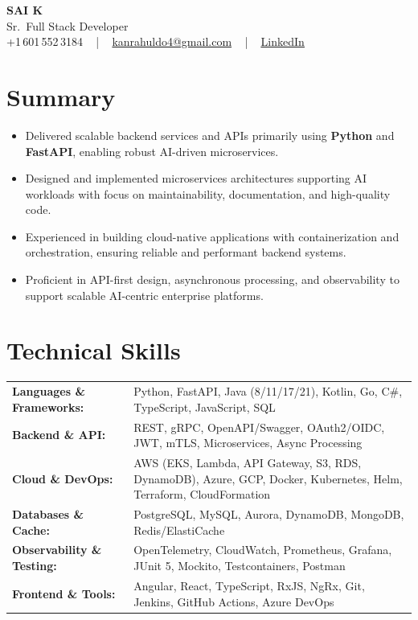 \documentclass[letterpaper,11pt]{article}
\newcommand{\resumeItem}[1]{
  \item\footnotesize{
    {#1 \vspace{-2pt}}
  }
}
\newcommand{\resumeItemListStart}{\begin{itemize}[leftmargin=*]}
\newcommand{\resumeItemListEnd}{\end{itemize}\vspace{-5pt}}
\begin{document}
\begin{center}
    {\fontsize{14pt}{12pt}\selectfont \textbf{\MakeUppercase{Sai K}}}\\ \vspace{2pt}
    \fontsize{10pt}{12pt}\selectfont Sr.\ Full Stack Developer\\ \vspace{2pt}
    \fontsize{10pt}{12pt}\selectfont +1\,601\,552\,3184 ~ | ~
    \href{mailto:kanrahuldo4@gmail.com}{kanrahuldo4@gmail.com} ~ | ~
    \href{https://www.linkedin.com/in/srrrk/}{\color{blue}\underline{LinkedIn}}
    \vspace{-10pt}
\end{center}

\section{Summary}
\fontsize{9pt}{10pt}\selectfont
\resumeItemListStart
  \resumeItem{Delivered scalable backend services and APIs primarily using \textbf{Python} and \textbf{FastAPI}, enabling robust AI-driven microservices.}
  \resumeItem{Designed and implemented microservices architectures supporting AI workloads with focus on maintainability, documentation, and high-quality code.}
  \resumeItem{Experienced in building cloud-native applications with containerization and orchestration, ensuring reliable and performant backend systems.}
  \resumeItem{Proficient in API-first design, asynchronous processing, and observability to support scalable AI-centric enterprise platforms.}
\resumeItemListEnd
\vspace{-6pt}

\section{Technical Skills}
\vspace{-14pt}
\begin{table}[h]
\fontsize{9pt}{10pt}\selectfont
\begin{tabular}{p{0.3\linewidth} p{0.7\linewidth}}
\textbf{Languages \& Frameworks:} & Python, FastAPI, Java (8/11/17/21), Kotlin, Go, C\#, TypeScript, JavaScript, SQL \\
\textbf{Backend \& API:} & REST, gRPC, OpenAPI/Swagger, OAuth2/OIDC, JWT, mTLS, Microservices, Async Processing \\
\textbf{Cloud \& DevOps:} & AWS (EKS, Lambda, API Gateway, S3, RDS, DynamoDB), Azure, GCP, Docker, Kubernetes, Helm, Terraform, CloudFormation \\
\textbf{Databases \& Cache:} & PostgreSQL, MySQL, Aurora, DynamoDB, MongoDB, Redis/ElastiCache \\
\textbf{Observability \& Testing:} & OpenTelemetry, CloudWatch, Prometheus, Grafana, JUnit 5, Mockito, Testcontainers, Postman \\
\textbf{Frontend \& Tools:} & Angular, React, TypeScript, RxJS, NgRx, Git, Jenkins, GitHub Actions, Azure DevOps \\
\end{tabular}
\end{table}
\vspace{-15pt}
\end{document}
